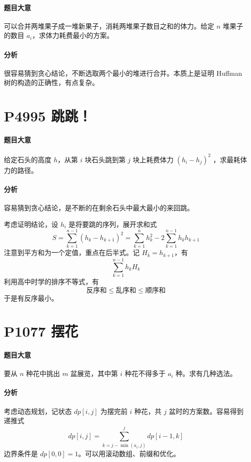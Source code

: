 \paragraph{题目大意}

可以合并两堆果子成一堆新果子，消耗两堆果子数目之和的体力。给定 $n$ 堆果子的数目 $a_i$，求体力耗费最小的方案。

\paragraph{分析}

很容易猜到贪心结论，不断选取两个最小的堆进行合并。本质上是证明 Huffman 树的构造的正确性，有点复杂。

\section{P4995 跳跳！}

\paragraph{题目大意}

给定石头的高度 $h$，从第 $i$ 块石头跳到第 $j$ 块上耗费体力 $(h_i-h_j)^2$ ，求最耗体力的路径。

\paragraph{分析}

容易猜到贪心结论，是不断的在剩余石头中最大最小的来回跳。

考虑证明结论，设 $h_i$ 是将要跳的序列，展开求和式
\[ S = \sum_{k=1}^{n-1}(h_k-h_{k+1})^2 = \sum_{k=1}^nh_k^2 - 2\sum_{k=1}^{n-1}h_kh_{k+1} \]
注意到平方和为一个定值，重点在后半式。记 $H_k = h_{k+1}$，有
\[ \sum_{k=1}^{n-1}h_kH_k \]
利用高中时学的排序不等式，有
\[ \text{反序和} \leqslant \text{乱序和} \leqslant \text{顺序和} \]
于是有反序最小。

\section{P1077 摆花}

\paragraph{题目大意}

要从 $n$ 种花中挑出 $m$ 盆展览，其中第 $i$ 种花不得多于 $a_i$ 种。求有几种选法。

\paragraph{分析}

考虑动态规划，记状态 $dp[i,j]$ 为摆完前 $i$ 种花，共 $j$ 盆时的方案数。容易得到递推式
\[ dp[i,j] = \sum_{k = j - \min(a_i, j)}^j dp[i-1,k] \]
边界条件是 $dp[0,0] = 1$。可以用滚动数组、前缀和优化。
